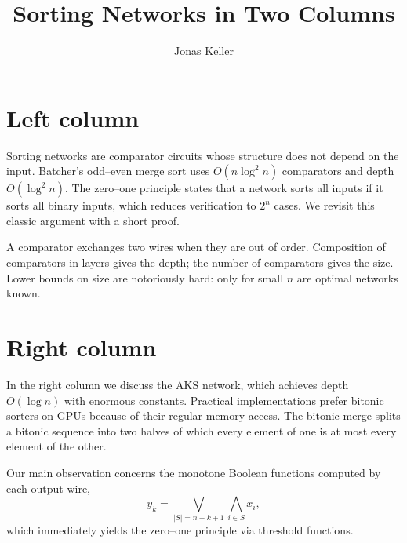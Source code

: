 \documentclass[10pt,twocolumn]{article}
\title{Sorting Networks in Two Columns}
\author{Jonas Keller}
\date{}
\begin{document}
\maketitle
\section{Left column}
Sorting networks are comparator circuits whose structure does not depend on the input. Batcher's
odd--even merge sort uses $O(n \log^2 n)$ comparators and depth $O(\log^2 n)$. The zero--one
principle states that a network sorts all inputs if it sorts all binary inputs, which reduces
verification to $2^n$ cases. We revisit this classic argument with a short proof.

A comparator exchanges two wires when they are out of order. Composition of comparators in
layers gives the depth; the number of comparators gives the size. Lower bounds on size are
notoriously hard: only for small $n$ are optimal networks known.
\section{Right column}
In the right column we discuss the AKS network, which achieves depth $O(\log n)$ with enormous
constants. Practical implementations prefer bitonic sorters on GPUs because of their regular
memory access. The bitonic merge splits a bitonic sequence into two halves of which every
element of one is at most every element of the other.

Our main observation concerns the monotone Boolean functions computed by each output wire,
\begin{equation}
  y_k = \bigvee_{|S| = n-k+1} \bigwedge_{i\in S} x_i ,
\end{equation}
which immediately yields the zero--one principle via threshold functions.
\end{document}
